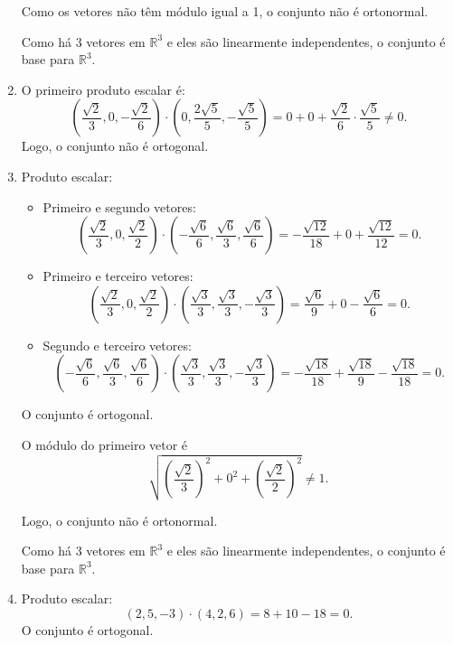 \begin{resolution}
\begin{enumerate}[label=\alph*)]
          Como os vetores não têm módulo igual a 1, o conjunto não é ortonormal.

          Como há 3 vetores em \(\mathbb{R}^3\) e eles são linearmente independentes, o conjunto é base para \(\mathbb{R}^3\).

    \item O primeiro produto escalar é:
          \[
            \left(\frac{\sqrt{2}}{3}, 0, -\frac{\sqrt{2}}{6}\right) \cdot \left(0, \frac{2\sqrt{5}}{5}, -\frac{\sqrt{5}}{5}\right) = 0 + 0 + \frac{\sqrt{2}}{6} \cdot \frac{\sqrt{5}}{5} \neq 0.
          \]
          Logo, o conjunto não é ortogonal.

    \item Produto escalar:
          \begin{itemize}
            \item Primeiro e segundo vetores:
                  \[
                    \left(\frac{\sqrt{2}}{3}, 0, \frac{\sqrt{2}}{2}\right) \cdot \left(-\frac{\sqrt{6}}{6}, \frac{\sqrt{6}}{3}, \frac{\sqrt{6}}{6}\right) = -\frac{\sqrt{12}}{18} + 0 + \frac{\sqrt{12}}{12} = 0.
                  \]
            \item  Primeiro e terceiro vetores:
                  \[
                    \left(\frac{\sqrt{2}}{3}, 0, \frac{\sqrt{2}}{2}\right) \cdot \left(\frac{\sqrt{3}}{3}, \frac{\sqrt{3}}{3}, -\frac{\sqrt{3}}{3}\right) = \frac{\sqrt{6}}{9} + 0 - \frac{\sqrt{6}}{6} = 0.
                  \]
            \item Segundo e terceiro vetores:
                  \[
                    \left(-\frac{\sqrt{6}}{6}, \frac{\sqrt{6}}{3}, \frac{\sqrt{6}}{6}\right) \cdot \left(\frac{\sqrt{3}}{3}, \frac{\sqrt{3}}{3}, -\frac{\sqrt{3}}{3}\right) = -\frac{\sqrt{18}}{18} + \frac{\sqrt{18}}{9} - \frac{\sqrt{18}}{18} = 0.
                  \]
          \end{itemize}

          O conjunto é ortogonal.

          O módulo do primeiro vetor é
          \[
            \sqrt{\left(\frac{\sqrt{2}}{3}\right)^2 + 0^2 + \left(\frac{\sqrt{2}}{2}\right)^2} \neq 1.
          \]

          Logo, o conjunto não é ortonormal.

          Como há 3 vetores em \(\mathbb{R}^3\) e eles são linearmente independentes, o conjunto é base para \(\mathbb{R}^3\).

    \item Produto escalar:
          \[
            (2, 5, -3) \cdot (4, 2, 6) = 8 + 10 - 18 = 0.
          \]
          O conjunto é ortogonal.


\end{enumerate}
\end{resolution}
